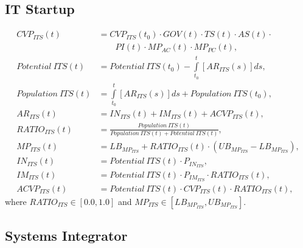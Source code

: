 \subsection{IT Startup}\label{ch:app04:csf:its}

\begin{align}
		CVP_{ITS}(t) &= CVP_{ITS}(t_0) \cdot GOV(t) \cdot TS(t) \cdot AS(t) \cdot \nonumber \\ &\qquad PI(t) \cdot MP_{AC}(t) \cdot MP_{PC}(t),\\
		\mathit{Potential~ITS(t)} &=\mathit{Potential~ITS(t_0)} - \int\limits_{t_0}^t  [AR_{ITS}(s)]ds,\\
		\mathit{Population~ITS(t)} &= \int\limits_{t_0}^t [AR_{ITS}(s)]ds + \mathit{Population~ITS(t_0)},\\
		AR_{ITS}(t) &= IN_{ITS}(t) + IM_{ITS}(t) + ACVP_{ITS}(t),\\
		RATIO_{ITS}(t) &= \frac{\mathit{Population~ITS(t)}}{\mathit{Population~ITS(t)} + \mathit{Potential~ITS(t)}},\label{eq:its:ratio}\\
		MP_{ITS}(t) &= LB_{MP_{ITS}} + RATIO_{ITS}(t) \cdot (UB_{MP_{ITS}} - LB_{MP_{ITS}}) \label{eq:mp:its},\\
		IN_{ITS}(t) &= \mathit{Potential~ITS(t)} \cdot P_{IN_{ITS}},\\
		IM_{ITS}(t) &= \mathit{Potential~ITS(t)} \cdot P_{IM_{ITS}} \cdot RATIO_{ITS}(t),\\
		ACVP_{ITS}(t) &= \mathit{Potential~ITS(t)} \cdot CVP_{ITS}(t) \cdot RATIO_{ITS}(t),
\end{align}
where $RATIO_{ITS} \in [0.0,1.0]$ and $MP_{ITS} \in [LB_{MP_{ITS}},UB_{MP_{ITS}}]$.

\subsection{Systems Integrator}\label{ch:app04:csf:si}

